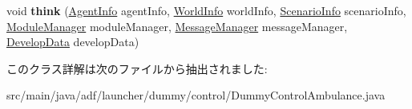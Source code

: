 \begin{DoxyCompactItemize}
\item 
\hypertarget{classadf_1_1launcher_1_1dummy_1_1control_1_1DummyControlAmbulance_ac43e9250db9403a32c58f81f0aaf08c4}{}\label{classadf_1_1launcher_1_1dummy_1_1control_1_1DummyControlAmbulance_ac43e9250db9403a32c58f81f0aaf08c4} 
void {\bfseries think} (\hyperlink{classadf_1_1agent_1_1info_1_1AgentInfo}{Agent\+Info} agent\+Info, \hyperlink{classadf_1_1agent_1_1info_1_1WorldInfo}{World\+Info} world\+Info, \hyperlink{classadf_1_1agent_1_1info_1_1ScenarioInfo}{Scenario\+Info} scenario\+Info, \hyperlink{classadf_1_1agent_1_1module_1_1ModuleManager}{Module\+Manager} module\+Manager, \hyperlink{classadf_1_1agent_1_1communication_1_1MessageManager}{Message\+Manager} message\+Manager, \hyperlink{classadf_1_1agent_1_1develop_1_1DevelopData}{Develop\+Data} develop\+Data)
\end{DoxyCompactItemize}


このクラス詳解は次のファイルから抽出されました\+:\begin{DoxyCompactItemize}
\item 
src/main/java/adf/launcher/dummy/control/Dummy\+Control\+Ambulance.\+java\end{DoxyCompactItemize}
